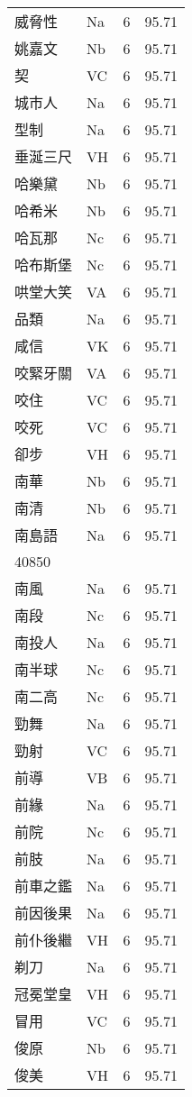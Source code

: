 \documentclass[twocolumn]{book}
\begin{document}
\begin{supertabular}{llrr}
威脅性 & Na & 6 &  95.71\\
姚嘉文 & Nb & 6 &  95.71\\
契 & VC & 6 &  95.71\\
城市人 & Na & 6 &  95.71\\
型制 & Na & 6 &  95.71\\
垂涎三尺 & VH & 6 &  95.71\\
哈樂黛 & Nb & 6 &  95.71\\
哈希米 & Nb & 6 &  95.71\\
哈瓦那 & Nc & 6 &  95.71\\
哈布斯堡 & Nc & 6 &  95.71\\
哄堂大笑 & VA & 6 &  95.71\\
品類 & Na & 6 &  95.71\\
咸信 & VK & 6 &  95.71\\
咬緊牙關 & VA & 6 &  95.71\\
咬住 & VC & 6 &  95.71\\
咬死 & VC & 6 &  95.71\\
卻步 & VH & 6 &  95.71\\
南華 & Nb & 6 &  95.71\\
南清 & Nb & 6 &  95.71\\
南島語 & Na & 6 &  95.71\\
40850\\
南風 & Na & 6 &  95.71\\
南段 & Nc & 6 &  95.71\\
南投人 & Na & 6 &  95.71\\
南半球 & Nc & 6 &  95.71\\
南二高 & Nc & 6 &  95.71\\
勁舞 & Na & 6 &  95.71\\
勁射 & VC & 6 &  95.71\\
前導 & VB & 6 &  95.71\\
前緣 & Na & 6 &  95.71\\
前院 & Nc & 6 &  95.71\\
前肢 & Na & 6 &  95.71\\
前車之鑑 & Na & 6 &  95.71\\
前因後果 & Na & 6 &  95.71\\
前仆後繼 & VH & 6 &  95.71\\
剃刀 & Na & 6 &  95.71\\
冠冕堂皇 & VH & 6 &  95.71\\
冒用 & VC & 6 &  95.71\\
俊原 & Nb & 6 &  95.71\\
俊美 & VH & 6 &  95.71\\

\end{supertabular}
\end{document}
